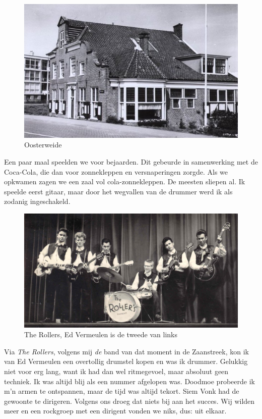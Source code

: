 \documentclass[12pt,twoside, openright]{memoir}
\begin{document}
\begin{figure}
\centering
\includegraphics[width=\textwidth]{img/134-Oosterweide}
\caption*{\footnotesize Oosterweide}
\end{figure}

Een paar maal speelden we voor bejaarden. Dit gebeurde in samenwerking met de Coca-Cola, die dan voor zonnekleppen en versnaperingen zorgde. Als we opkwamen zagen we een zaal vol cola-zonnekleppen. De meesten sliepen al. Ik speelde eerst gitaar, maar door het wegvallen van de drummer werd ik als zodanig ingeschakeld. 

\begin{figure}
\centering
\includegraphics[width=\textwidth]{img/135-rollers-foto1}
\caption*{\footnotesize The Rollers, Ed Vermeulen is de tweede van links}
\end{figure}

Via \emph{The Rollers}, volgens mij \emph{de} band van dat moment in de Zaanstreek, kon ik van Ed Vermeulen een overtollig drumstel kopen en was ik drummer. Gelukkig niet voor erg lang, want ik had dan wel ritmegevoel, maar absoluut geen techniek. Ik was altijd blij als een nummer afgelopen was. Doodmoe probeerde ik m'n armen te ontspannen, maar de tijd was altijd tekort. Siem Vonk had de gewoonte te dirigeren. Volgens ons droeg dat niets bij aan het succes. Wij wilden meer en een rockgroep met een dirigent vonden we niks, dus: uit elkaar. 
\end{document}
